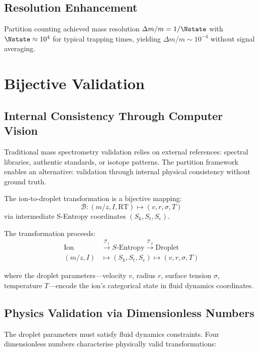 \subsection{Resolution Enhancement}

Partition counting achieved mass resolution $\Delta m/m = 1/\Nstate$ with $\Nstate \approx 10^4$ for typical trapping times, yielding $\Delta m/m \sim 10^{-4}$ without signal averaging.

\section{Bijective Validation}
\label{sec:bijective}

\subsection{Internal Consistency Through Computer Vision}

Traditional mass spectrometry validation relies on external references: spectral libraries, authentic standards, or isotope patterns. The partition framework enables an alternative: validation through internal physical consistency without ground truth.

\begin{definition}
The ion-to-droplet transformation is a bijective mapping:
\begin{equation}
    \mathcal{B}: (m/z, I, \text{RT}) \mapsto (v, r, \sigma, T)
\end{equation}
via intermediate S-Entropy coordinates $(S_k, S_t, S_e)$.
\end{definition}

The transformation proceeds:
\begin{align}
    \text{Ion} &\xrightarrow{\mathcal{T}_1} S\text{-Entropy} \xrightarrow{\mathcal{T}_2} \text{Droplet} \\
    (m/z, I) &\mapsto (S_k, S_t, S_e) \mapsto (v, r, \sigma, T)
\end{align}

where the droplet parameters---velocity $v$, radius $r$, surface tension $\sigma$, temperature $T$---encode the ion's categorical state in fluid dynamics coordinates.

\subsection{Physics Validation via Dimensionless Numbers}

The droplet parameters must satisfy fluid dynamics constraints. Four dimensionless numbers characterise physically valid transformations:

